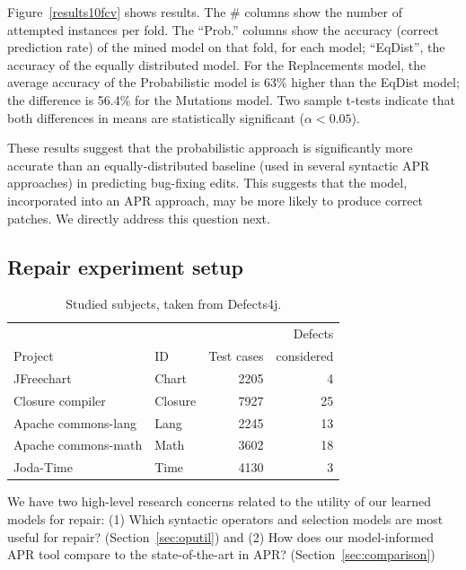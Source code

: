 \documentclass[conference]{IEEEtran}
\newcommand{\todo}[1]
  {{\scriptsize \textbf{\color{red} {#1}}}}
\begin{document}
Figure~\ref{results10fcv} shows results.  The \# columns 
show the number of attempted instances per fold.  The ``Prob.'' columns show the
accuracy (correct prediction rate) of the mined model on that fold, for each model; ``EqDist'',
the accuracy of the equally distributed model.  For the Replacements model,
the average accuracy of the Probabilistic model is 63\% higher than the EqDist
model; the difference is 56.4\% for the Mutations model.
Two sample t-tests indicate that both differences in means are statistically significant
($\alpha<0.05$). 

These results suggest that the probabilistic approach is
significantly more accurate than an equally-distributed baseline (used in
several syntactic APR approaches) in predicting bug-fixing edits.  This suggests
that the model, incorporated into an APR approach, may be more likely to produce
correct patches.  We directly address this question next.


\subsection{Repair experiment setup}
\label{sec:repairSetup}

\begin{table}[ht]
\centering
  \caption{Studied subjects, taken from Defects4j. \label{defects4j}}
\begin{tabular}{llrr}
\toprule
         &     &            &  Defects\\
 Project & ID & Test cases & considered \\
\midrule
JFreechart & Chart & 2205 & 4\\
Closure compiler & Closure & 7927 & 25\\
Apache commons-lang & Lang  & 2245 & 13\\
Apache commons-math & Math & 3602 & 18\\
Joda-Time & Time & 4130 & 3\\
\bottomrule
\end{tabular}
\center
\end{table} 


We have two high-level research concerns related to the utility of our
learned models for repair: 
(1) Which syntactic operators and selection models are most
  useful for repair? (Section~\ref{sec:oputil}) and (2)
How does our model-informed APR tool compare to the
    state-of-the-art in APR? (Section~\ref{sec:comparison})
\end{document}
